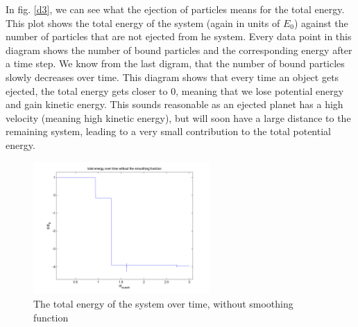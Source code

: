 \documentclass[10pt,a4paper]{article}
\begin{document}
In fig. \ref{d3}, we can see what the ejection of particles means for the total energy. This plot shows the total energy of the system (again in units of $E_0$) against the number of particles that are not ejected from he system. Every data point in this diagram shows the number of bound particles and the corresponding energy after a time step. We know from the last digram, that the number of bound particles slowly decreases over time. This diagram shows that every time an object gets ejected, the total energy gets closer to $0$, meaning that we lose potential energy and gain kinetic energy. This sounds reasonable as an ejected planet has a high velocity (meaning high kinetic energy), but will soon have a large distance to the remaining system, leading to a very small contribution to the total potential energy.
\begin{figure}[h]
\centering
	\includegraphics[width=0.6\textwidth]{c1.png}
	\caption{The total energy of the system over time, without smoothing 		function\label{c1}}
\end{figure}
\end{document}

